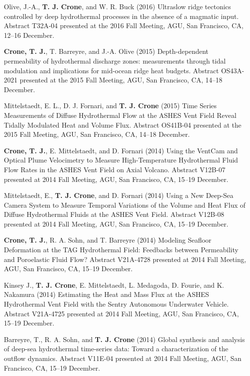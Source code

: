 \documentclass[11pt]{res}
\begin{document}
\begin{resume}
Olive, J.-A., {\bf T. J. Crone}, and W. R. Buck (2016) Ultraslow ridge tectonics controlled by deep hydrothermal processes in the absence of a magmatic input. Abstract T32A-04 presented at the 2016 Fall Meeting, AGU, San Francisco, CA, 12--16 December.

{\bf Crone, T. J.},  T. Barreyre, and J.-A. Olive (2015) Depth-dependent permeability of hydrothermal discharge zones: measurements through tidal modulation and implications for mid-ocean ridge heat budgets. Abstract OS43A-2021 presented at the 2015 Fall Meeting, AGU, San Francisco, CA, 14--18 December.

Mittelstaedt, E. L., D. J. Fornari, and {\bf T. J. Crone} (2015) Time Series Measurements of Diffuse Hydrothermal Flow at the ASHES Vent Field Reveal Tidally Modulated Heat and Volume Flux. Abstract OS41B-04 presented at the 2015 Fall Meeting, AGU, San Francisco, CA, 14--18 December.

{\bf Crone, T. J.}, E. Mittelstaedt, and D. Fornari (2014) Using the VentCam and Optical Plume Velocimetry to Measure High-Temperature Hydrothermal Fluid Flow Rates in the ASHES Vent Field on Axial Volcano. Abstract V12B-07 presented at 2014 Fall Meeting, AGU, San Francisco, CA, 15--19 December.

Mittelstaedt, E., {\bf T. J. Crone}, and D. Fornari (2014) Using a New Deep-Sea Camera System to Measure Temporal Variations of the Volume and Heat Flux of Diffuse Hydrothermal Fluids at the ASHES Vent Field. Abstract V12B-08 presented at 2014 Fall Meeting, AGU, San Francisco, CA, 15--19 December.

{\bf Crone, T. J.}, R. A. Sohn, and T. Barreyre (2014) Modeling Seafloor Deformation at the TAG Hydrothermal Field: Feedbacks between Permeability and Poroelastic Fluid Flow? Abstract V21A-4728 presented at 2014 Fall Meeting, AGU, San Francisco, CA, 15--19 December.

Kinsey J., {\bf T. J. Crone}, E. Mittelstaedt, L. Medagoda, D. Fourie, and K. Nakamura (2014) Estimating the Heat and Mass Flux at the ASHES Hydrothermal Vent Field with the Sentry Autonomous Underwater Vehicle. Abstract V21A-4725 presented at 2014 Fall Meeting, AGU, San Francisco, CA, 15--19 December.

Barreyre, T., R. A. Sohn, and {\bf T. J. Crone} (2014) Global synthesis and analysis of deep-sea hydrothermal time-series data: Toward a characterization of the outflow dynamics. Abstract V11E-04 presented at 2014 Fall Meeting, AGU, San Francisco, CA, 15--19 December.


\end{resume}
\end{document}
